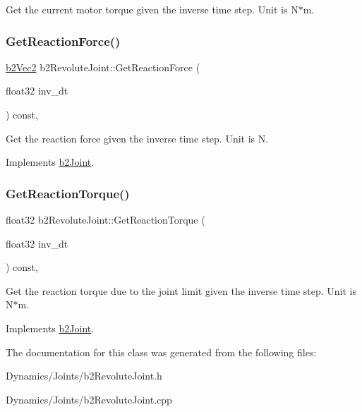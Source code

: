 Get the current motor torque given the inverse time step. Unit is N$\ast$m. \mbox{\label{classb2RevoluteJoint_abeb7bf941589aed0d7f330a578a62024}} 
\subsubsection{\texorpdfstring{Get\+Reaction\+Force()}{GetReactionForce()}}
{\footnotesize\ttfamily \mbox{\hyperlink{structb2Vec2}{b2\+Vec2}} b2\+Revolute\+Joint\+::\+Get\+Reaction\+Force (\begin{DoxyParamCaption}\item[{float32}]{inv\+\_\+dt }\end{DoxyParamCaption}) const\hspace{0.3cm}{\ttfamily [override]}, {\ttfamily [virtual]}}

Get the reaction force given the inverse time step. Unit is N. 

Implements \mbox{\hyperlink{classb2Joint_a7e0eddefb9b69ad050b8ef6425838a74}{b2\+Joint}}.

\mbox{\label{classb2RevoluteJoint_aab61a3f330aa93ae28f657e36bc3db51}} 
\subsubsection{\texorpdfstring{Get\+Reaction\+Torque()}{GetReactionTorque()}}
{\footnotesize\ttfamily float32 b2\+Revolute\+Joint\+::\+Get\+Reaction\+Torque (\begin{DoxyParamCaption}\item[{float32}]{inv\+\_\+dt }\end{DoxyParamCaption}) const\hspace{0.3cm}{\ttfamily [override]}, {\ttfamily [virtual]}}

Get the reaction torque due to the joint limit given the inverse time step. Unit is N$\ast$m. 

Implements \mbox{\hyperlink{classb2Joint_ae355e441c2aa842777dc04e24f15ced0}{b2\+Joint}}.



The documentation for this class was generated from the following files\+:\begin{DoxyCompactItemize}
\item 
Dynamics/\+Joints/b2\+Revolute\+Joint.\+h\item 
Dynamics/\+Joints/b2\+Revolute\+Joint.\+cpp\end{DoxyCompactItemize}
